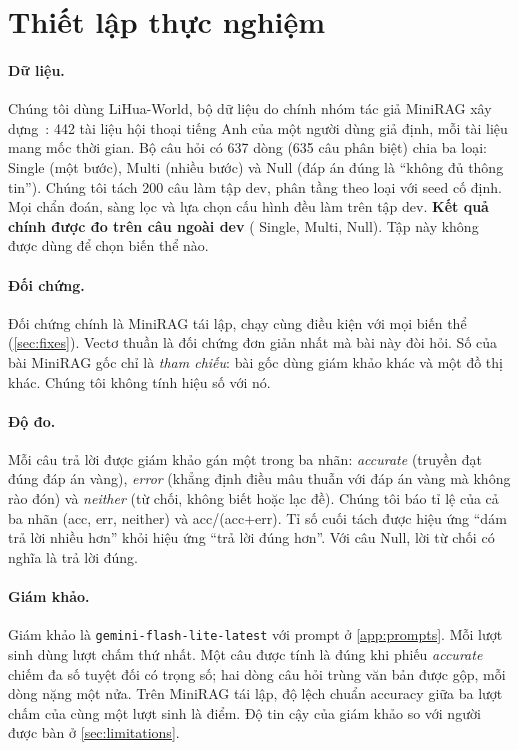 \section{Thiết lập thực nghiệm}\label{sec:setup}

\paragraph{Dữ liệu.}
Chúng tôi dùng LiHua-World, bộ dữ liệu do chính nhóm tác giả MiniRAG xây dựng~\cite{fan2025minirag}: 442 tài liệu hội thoại tiếng Anh của một người dùng giả định, mỗi tài liệu mang mốc thời gian.
Bộ câu hỏi có 637 dòng (635 câu phân biệt) chia ba loại: Single (một bước), Multi (nhiều bước) và Null (đáp án đúng là ``không đủ thông tin'').
Chúng tôi tách 200 câu làm tập dev, phân tầng theo loại với seed cố định.
Mọi chẩn đoán, sàng lọc và lựa chọn cấu hình đều làm trên tập dev.
\textbf{Kết quả chính được đo trên \nHeld{} câu ngoài dev} (\nHeldSingle{} Single, \nHeldMulti{} Multi, \nHeldNull{} Null). Tập này không được dùng để chọn biến thể nào.

\paragraph{Đối chứng.}
Đối chứng chính là MiniRAG tái lập, chạy cùng điều kiện với mọi biến thể (\cref{sec:fixes}).
Vectơ thuần là đối chứng đơn giản nhất mà bài này đòi hỏi.
Số của bài MiniRAG gốc chỉ là \emph{tham chiếu}: bài gốc dùng giám khảo khác và một đồ thị khác. Chúng tôi không tính hiệu số với nó.

\paragraph{Độ đo.}
Mỗi câu trả lời được giám khảo gán một trong ba nhãn: \emph{accurate} (truyền đạt đúng đáp án vàng), \emph{error} (khẳng định điều mâu thuẫn với đáp án vàng mà không rào đón) và \emph{neither} (từ chối, không biết hoặc lạc đề).
Chúng tôi báo tỉ lệ của cả ba nhãn (acc, err, neither) và acc/(acc+err).
Tỉ số cuối tách được hiệu ứng ``dám trả lời nhiều hơn'' khỏi hiệu ứng ``trả lời đúng hơn''.
Với câu Null, lời từ chối có nghĩa là trả lời đúng.

\paragraph{Giám khảo.}
Giám khảo là \texttt{gemini-flash-lite-latest} với prompt ở \cref{app:prompts}.
Mỗi lượt sinh dùng lượt chấm thứ nhất. Một câu được tính là đúng khi phiếu \emph{accurate} chiếm đa số tuyệt đối có trọng số; hai dòng câu hỏi trùng văn bản được gộp, mỗi dòng nặng một nửa.
Trên MiniRAG tái lập, độ lệch chuẩn accuracy giữa ba lượt chấm của cùng một lượt sinh là \sdJudgeBase{} điểm.
Độ tin cậy của giám khảo so với người được bàn ở \cref{sec:limitations}.

